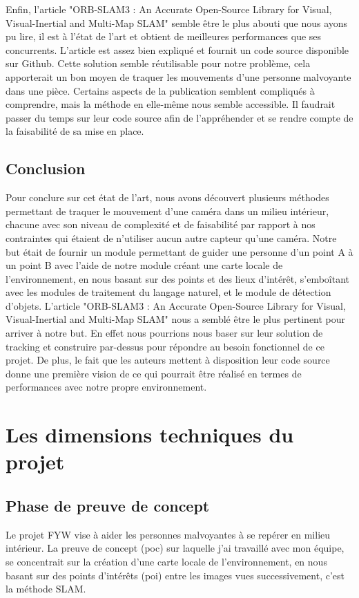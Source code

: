\documentclass[11pt]{article}
\begin{document}
      Enfin, l'article "ORB-SLAM3 : An Accurate Open-Source Library for Visual, Visual-Inertial and Multi-Map SLAM" semble être le plus abouti
      que nous ayons pu lire, il est à l'état de l'art et obtient de meilleures performances que ses concurrents. L'article est assez bien expliqué
      et fournit un code source disponible sur Github. Cette solution semble réutilisable pour notre problème, cela apporterait un bon moyen
      de traquer les mouvements d'une personne malvoyante dans une pièce. Certains aspects de la publication semblent compliqués à comprendre, mais la méthode en 
      elle-même nous semble accessible. Il faudrait passer du temps sur leur code source afin de l'appréhender et se rendre compte de la faisabilité
      de sa mise en place.

    \pagebreak

    \subsection{Conclusion}
      Pour conclure sur cet état de l'art, nous avons découvert plusieurs méthodes permettant de traquer le mouvement d'une caméra dans un
      milieu intérieur, chacune avec son niveau de complexité et de faisabilité par rapport à nos contraintes qui étaient de n'utiliser aucun
      autre capteur qu'une caméra. Notre but était de fournir un module permettant de guider une personne d'un point A à un point B avec 
      l'aide de notre module créant une carte locale de l'environnement, en nous basant sur des points et des lieux d'intérêt, 
      s'emboîtant avec les modules de traitement du langage naturel, et le module de détection d'objets. 
      L'article "ORB-SLAM3 : An Accurate Open-Source Library for Visual, Visual-Inertial and Multi-Map SLAM" 
      nous a semblé être le plus pertinent pour arriver à notre but. En effet nous pourrions nous baser sur leur solution de tracking et construire 
      par-dessus pour répondre au besoin fonctionnel de ce projet.
      De plus, le fait que les auteurs mettent à disposition leur code source donne une première vision de ce qui pourrait être réalisé en termes de 
      performances avec notre propre environnement.

    \pagebreak

  \section{Les dimensions techniques du projet}
    \subsection{Phase de preuve de concept}
      Le projet FYW vise à aider les personnes malvoyantes à se repérer en milieu intérieur. 
      La preuve de concept (\acrshort{poc}) sur laquelle j'ai travaillé avec mon équipe, se concentrait sur la création d'une carte locale
      de l'environnement, en nous basant sur des points d'intérêts (\acrshort{poi}) entre les images vues successivement, c'est la méthode
      SLAM.
\end{document}
